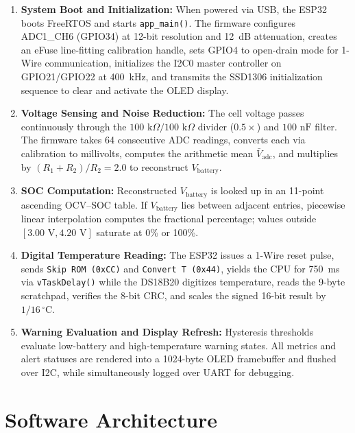 \documentclass[12pt,a4paper]{article}
\begin{document}
\begin{enumerate}
    \item \textbf{System Boot and Initialization:} When powered via USB, the ESP32 boots FreeRTOS and starts \texttt{app\_main()}. The firmware configures ADC1\_CH6 (GPIO34) at 12-bit resolution and 12~dB attenuation, creates an eFuse line-fitting calibration handle, sets GPIO4 to open-drain mode for 1-Wire communication, initializes the I2C0 master controller on GPIO21/GPIO22 at 400~kHz, and transmits the SSD1306 initialization sequence to clear and activate the OLED display.
    \item \textbf{Voltage Sensing and Noise Reduction:} The cell voltage passes continuously through the $100\text{ k}\Omega / 100\text{ k}\Omega$ divider ($0.5\times$) and $100\text{ nF}$ filter. The firmware takes 64 consecutive ADC readings, converts each via calibration to millivolts, computes the arithmetic mean $\bar{V}_{\text{adc}}$, and multiplies by $(R_1 + R_2)/R_2 = 2.0$ to reconstruct $V_{\text{battery}}$.
    \item \textbf{SOC Computation:} Reconstructed $V_{\text{battery}}$ is looked up in an 11-point ascending OCV--SOC table. If $V_{\text{battery}}$ lies between adjacent entries, piecewise linear interpolation computes the fractional percentage; values outside $[3.00\text{ V}, 4.20\text{ V}]$ saturate at 0\% or 100\%.
    \item \textbf{Digital Temperature Reading:} The ESP32 issues a 1-Wire reset pulse, sends \texttt{Skip ROM (0xCC)} and \texttt{Convert T (0x44)}, yields the CPU for 750~ms via \texttt{vTaskDelay()} while the DS18B20 digitizes temperature, reads the 9-byte scratchpad, verifies the 8-bit CRC, and scales the signed 16-bit result by $1/16\,^\circ\text{C}$.
    \item \textbf{Warning Evaluation and Display Refresh:} Hysteresis thresholds evaluate low-battery and high-temperature warning states. All metrics and alert statuses are rendered into a 1024-byte OLED framebuffer and flushed over I2C, while simultaneously logged over UART for debugging.
\end{enumerate}

\section{Software Architecture}
\label{sec:software_architecture}
\end{document}
